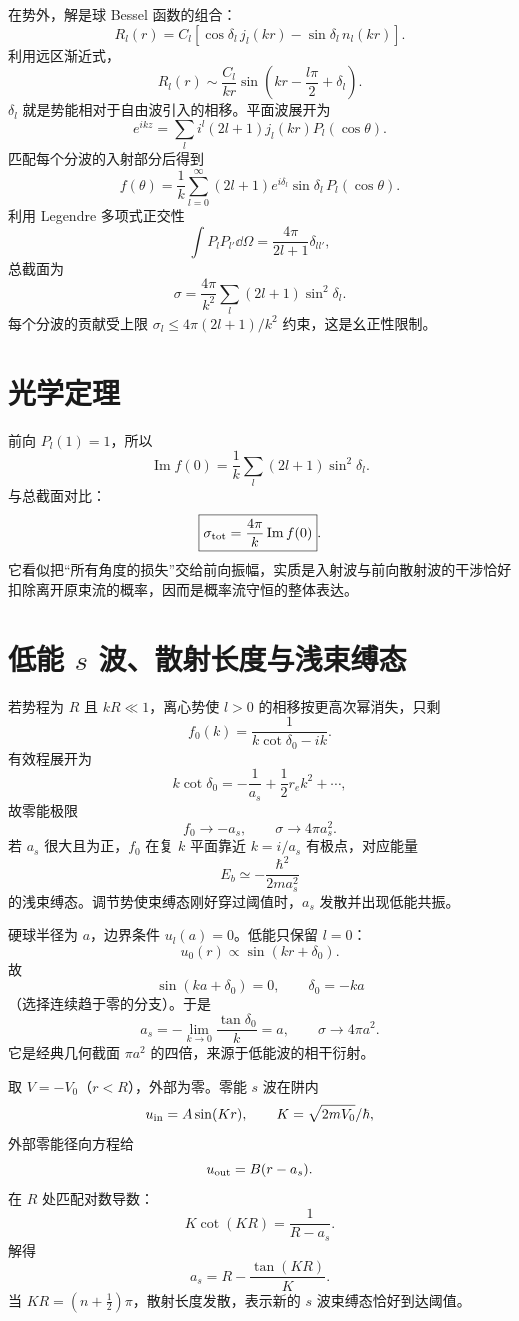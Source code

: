 在势外，解是球 Bessel 函数的组合：
\[
R_l(r)=C_l[\cos\delta_l\,j_l(kr)-\sin\delta_l\,n_l(kr)].
\]
利用远区渐近式，
\[
R_l(r)\sim\frac{C_l}{kr}
\sin\left(kr-\frac{l\pi}{2}+\delta_l\right).
\]
$\delta_l$ 就是势能相对于自由波引入的相移。平面波展开为
\[
e^{ikz}=\sum_l i^l(2l+1)j_l(kr)P_l(\cos\theta).
\]
匹配每个分波的入射部分后得到
\[
\boxed{
f(\theta)=\frac1k\sum_{l=0}^\infty
(2l+1)e^{i\delta_l}\sin\delta_l\,P_l(\cos\theta)}.
\]
利用 Legendre 多项式正交性
\[
\int P_lP_{l'}\dd\Omega=\frac{4\pi}{2l+1}\delta_{ll'},
\]
总截面为
\[
\boxed{\sigma=\frac{4\pi}{k^2}
\sum_l(2l+1)\sin^2\delta_l}.
\]
每个分波的贡献受上限
$\sigma_l\le4\pi(2l+1)/k^2$ 约束，这是幺正性限制。

\section{光学定理}
前向 $P_l(1)=1$，所以
\[
\operatorname{Im}f(0)
=\frac1k\sum_l(2l+1)\sin^2\delta_l.
\]
与总截面对比：
\[
\boxed{\sigma_{\rm tot}=\frac{4\pi}{k}\operatorname{Im}f(0)}.
\]
它看似把“所有角度的损失”交给前向振幅，实质是入射波与前向散射波的干涉恰好扣除离开原束流的概率，因而是概率流守恒的整体表达。

\section{低能 $s$ 波、散射长度与浅束缚态}
若势程为 $R$ 且 $kR\ll1$，离心势使 $l>0$ 的相移按更高次幂消失，只剩
\[
f_0(k)=\frac1{k\cot\delta_0-ik}.
\]
有效程展开为
\[
k\cot\delta_0=-\frac1{a_s}+\frac12r_ek^2+\cdots,
\]
故零能极限
\[
f_0\to-a_s,\qquad \sigma\to4\pi a_s^2.
\]
若 $a_s$ 很大且为正，$f_0$ 在复 $k$ 平面靠近 $k=i/a_s$ 有极点，对应能量
\[
E_b\simeq-\frac{\hbar^2}{2ma_s^2}
\]
的浅束缚态。调节势使束缚态刚好穿过阈值时，$a_s$ 发散并出现低能共振。

\begin{examplebox}[title=硬球低能散射]
硬球半径为 $a$，边界条件 $u_l(a)=0$。低能只保留 $l=0$：
\[
u_0(r)\propto\sin(kr+\delta_0).
\]
故
\[
\sin(ka+\delta_0)=0,\qquad \delta_0=-ka
\]
（选择连续趋于零的分支）。于是
\[
a_s=-\lim_{k\to0}\frac{\tan\delta_0}{k}=a,
\qquad
\sigma\to4\pi a^2.
\]
它是经典几何截面 $\pi a^2$ 的四倍，来源于低能波的相干衍射。
\end{examplebox}

\begin{examplebox}[title=球形方阱的散射长度]
取 $V=-V_0$（$r<R$），外部为零。零能 $s$ 波在阱内
\[
u_{\rm in}=A\sin(Kr),\qquad
K=\sqrt{2mV_0}/\hbar,
\]
外部零能径向方程给
\[
u_{\rm out}=B(r-a_s).
\]
在 $R$ 处匹配对数导数：
\[
K\cot(KR)=\frac1{R-a_s}.
\]
解得
\[
\boxed{a_s=R-\frac{\tan(KR)}K}.
\]
当 $KR=(n+\tfrac12)\pi$，散射长度发散，表示新的 $s$ 波束缚态恰好到达阈值。
\end{examplebox}

